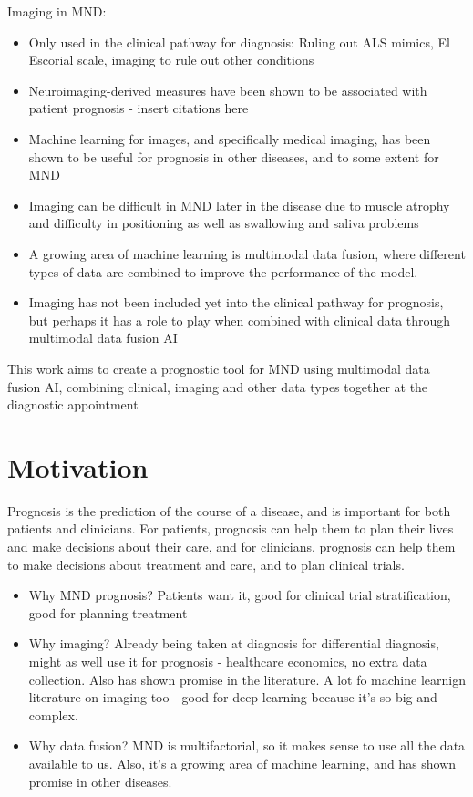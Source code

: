 \noindent Imaging in MND:
\begin{itemize}
    \item Only used in the clinical pathway for diagnosis: Ruling out ALS mimics, El Escorial scale, imaging to rule out other conditions
    \item Neuroimaging-derived measures have been shown to be associated with patient prognosis - insert citations here
    \item Machine learning for images, and specifically medical imaging, has been shown to be useful for prognosis in other diseases, and to some extent for MND
    \item Imaging can be difficult in MND later in the disease due to muscle atrophy and difficulty in positioning as well as swallowing and saliva problems
    \item A growing area of machine learning is multimodal data fusion, where different types of data are combined to improve the performance of the model.
    \item Imaging has not been included yet into the clinical pathway for prognosis, but perhaps it has a role to play when combined with clinical data through multimodal data fusion AI
\end{itemize}



This work aims to create a prognostic tool for MND using multimodal data fusion AI, combining clinical, imaging and other data types together at the diagnostic appointment


\section{Motivation}

Prognosis is the prediction of the course of a disease, and is important for both patients and clinicians.
For patients, prognosis can help them to plan their lives and make decisions about their care, and for clinicians, prognosis can help them to make decisions about treatment and care, and to plan clinical trials.

\begin{itemize}
    \item Why MND prognosis? Patients want it, good for clinical trial stratification, good for planning treatment
    \item Why imaging? Already being taken at diagnosis for differential diagnosis, might as well use it for prognosis - healthcare economics, no extra data collection. Also has shown promise in the literature. A lot fo machine learnign literature on imaging too - good for deep learning because it's so big and complex.
    \item Why data fusion? MND is multifactorial, so it makes sense to use all the data available to us. Also, it's a growing area of machine learning, and has shown promise in other diseases.
\end{itemize}

